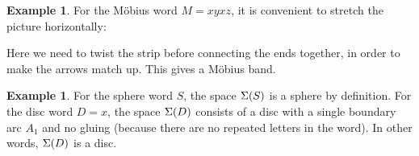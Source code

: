 \documentclass[reqno]{amsart}
\theoremstyle{definition}
\newtheorem{example}[theorem]{Example}
\begin{document}
\begin{example}\label{eg-mobius-word}
 For the M\"obius word $M=xyxz$, it is convenient to stretch the
 picture horizontally:
 \begin{center}
 \end{center}
 Here we need to twist the strip before connecting the ends together,
 in order to make the arrows match up.  This gives a M\"obius band.
\end{example}

\begin{example}\label{eg-sphere-word}
 For the sphere word $S$, the space $\Sigma(S)$ is a sphere by
 definition.  For the disc word $D=x$, the space $\Sigma(D)$ consists of
 a disc with a single boundary arc $A_1$ and no gluing (because there
 are no repeated letters in the word).  In other words, $\Sigma(D)$ is a
 disc.  
\end{example}
\end{document}
